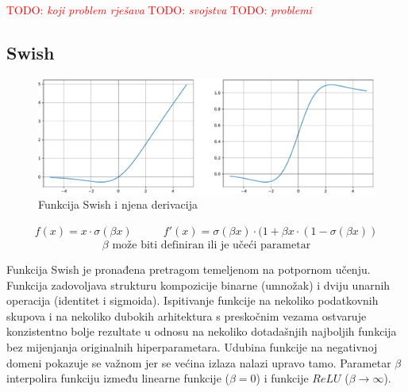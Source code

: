 \documentclass[times, utf8, numeric, diplomski]{fer}
\def\TODO#1{\noindent\textcolor{red}{TODO: \textit{#1}}\newline}
\def\todo#1{\TODO{#1}}
\def\todoimg#1{\begin{center} \textcolor{red}{\big[ IMAGE: \textit{#1} \big]} \end{center}}
\begin{document}
\todo{koji problem rješava}
\todo{svojstva}
\todo{problemi}

%

\subsection{Swish}
\label{func:swish}

\begin{figure}[H]
\includegraphics[width=\textwidth]{Swish.pdf}
\centering
\caption{Funkcija Swish i njena derivacija}
\label{fig:swish}
\end{figure}

\begin{equation}
\label{eq:swish}
\begin{split}
f(x) = x \cdot \sigma(\beta x)
\end{split}
\qquad
\begin{split}
f'(x) = \sigma(\beta x) \cdot (1 + \beta x \cdot (1-\sigma(\beta x))
\end{split}
\end{equation}
\begin{equation*}
\beta \text{ može biti definiran ili je učeći parametar}
\end{equation*}

Funkcija Swish je pronađena pretragom temeljenom na potpornom učenju. Funkcija zadovoljava strukturu kompozicije binarne (umnožak) i dviju unarnih operacija (identitet i sigmoida). Ispitivanje funkcije na nekoliko podatkovnih skupova i na nekoliko dubokih arhitektura s preskočnim vezama ostvaruje konzistentno bolje rezultate u odnosu na nekoliko dotadašnjih najboljih funkcija bez mijenjanja originalnih hiperparametara. Udubina funkcije na negativnoj domeni pokazuje se važnom jer se većina izlaza nalazi upravo tamo. Parametar $\beta$ interpolira funkciju između linearne funkcije ($\beta=0$) i funkcije $ReLU$ ($\beta \rightarrow \infty$). \citep{swish}
\end{document}
